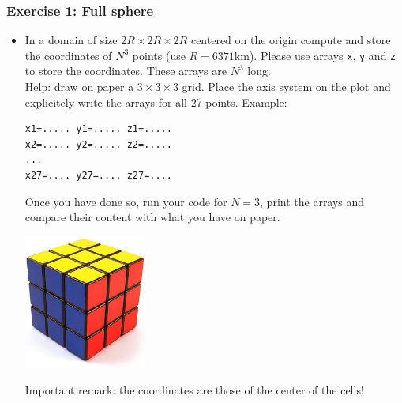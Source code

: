 \subsubsection*{Exercise 1: Full sphere}

\begin{itemize}
\item In a domain of size $2R\times 2R \times 2R$ centered on the origin compute and store the coordinates 
of $N^3$ points (use $R=6371$km). Please use arrays {\tt x}, {\tt y} and {\tt z} to store the coordinates.
These arrays are $N^3$ long.\\
Help: draw on paper a $3\times3\times3$ grid. Place the axis system on the plot and explicitely write the arrays 
for all 27 points. Example:
\begin{verbatim}
x1=..... y1=..... z1=.....
x2=..... y2=..... z2=.....
...
x27=.... y27=.... z27=....
\end{verbatim}
Once you have done so, run your code for $N=3$, print the arrays and compare their content with what you 
have on paper. \\

\begin{center}
\includegraphics[width=4cm]{images/gravity/rubik}
\end{center}

Important remark: the coordinates are those of the center of the cells!





\end{itemize}
